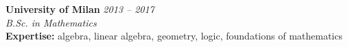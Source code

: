 \documentclass[a4paper,11pt]{article}
\begin{document}
\textbf{University of Milan} \hfill \textit{2013 -- 2017} \\
\textit{B.Sc. in Mathematics} \\
\textbf{Expertise:} algebra, linear algebra, geometry, logic, foundations of mathematics



%
%
%
%
%
%
\end{document}
